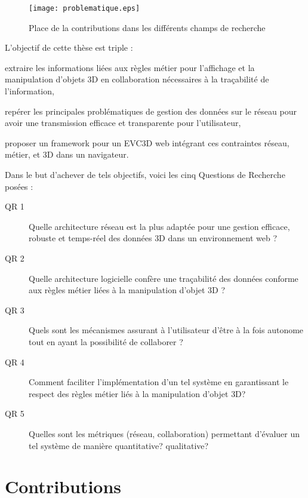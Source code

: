 \begin{figure}[hbt]
	\centering
	\texttt{[image: problematique.eps]}
	\caption{Place de la contributions dans les différents champs de recherche}
	\label{fig:problematique}
\end{figure}

L'objectif de cette thèse est triple : 
\begin{enumerate*}[label=(\roman*)]
	\item extraire les informations liées aux règles métier pour l'affichage et la 
	manipulation d'objets \gls{3D} en collaboration nécessaires à la traçabilité de 
	l'information,
	\item repérer les principales problématiques de gestion des données sur le 
	réseau pour avoir une transmission efficace et transparente pour l'utilisateur,
	\item proposer un \gls{framework} pour un \gls{EVC3D} web intégrant ces 
	contraintes réseau, métier, et \gls{3D} dans un navigateur.
\end{enumerate*}
Dans le but d'achever de tels objectifs, voici les cinq Questions de Recherche 
posées :
\begin{description}
	\item[QR 1] Quelle architecture réseau est la plus adaptée pour une gestion 
	efficace, robuste et temps-réel des données \gls{3D} dans un environnement 
	web ?
	
	\item[QR 2] Quelle architecture logicielle confère une traçabilité des données 
	conforme aux règles métier liées à la manipulation d'objet \gls{3D} ? 
	
	\item[QR 3] Quels sont les mécanismes assurant à l'utilisateur d'être à la fois 
	autonome tout en ayant la possibilité de collaborer ?
	
	
	\item[QR 4] Comment faciliter l'implémentation d'un tel système en garantissant 
	le respect des règles métier liés à la manipulation d'objet \gls{3D}?
	
	\item[QR 5] Quelles sont les métriques (réseau, collaboration) permettant 
	d'évaluer un tel système de manière quantitative? qualitative? %
	
\end{description}

\section{Contributions}

